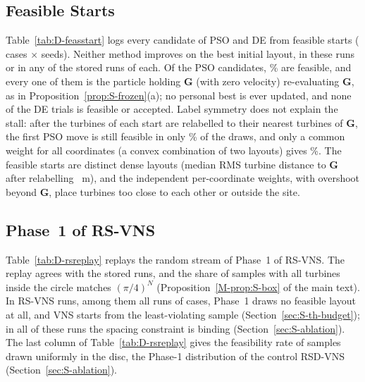 \documentclass[10pt]{article}
\begin{document}
\subsection{Feasible Starts}
\label{sec:S-diag-feas}
Table~\ref{tab:D-feasstart} logs every candidate of PSO and DE from feasible starts (\NDFsCases{} cases $\times$ \NDFsSeeds{} seeds). Neither method improves on the best initial layout, in these runs or in any of the \NDFsStoredRunsPSO{} stored runs of each. %
Of the \NDFsCandPSO{} PSO candidates, \NDFsFeasCandPSO\% are feasible, and every one of them is the particle holding $\mathbf G$ (with zero velocity) re-evaluating $\mathbf G$, as in Proposition~\ref{prop:S-frozen}(a); no personal best is ever updated, and none of the \NDFsCandDE{} DE trials is feasible or accepted. %
Label symmetry does not explain the stall: after the turbines of each start are relabelled to their nearest turbines of $\mathbf G$, the first PSO move is still feasible in only \NDFsMixMatched\% of the draws, and only a common weight for all coordinates (a convex combination of two layouts) gives \NDFsMixScalar\%. %
The feasible starts are distinct dense layouts (median RMS turbine distance to $\mathbf G$ after relabelling \NDFsInitRms~m), and the independent per-coordinate weights, with overshoot beyond $\mathbf G$, place turbines too close to each other or outside the site. %

\subsection{Phase~1 of RS-VNS}
\label{sec:S-diag-rs}
Table~\ref{tab:D-rsreplay} replays the random stream of Phase~1 of RS-VNS. The replay agrees with the stored runs, and the share of samples with all turbines inside the circle matches $(\pi/4)^N$ (Proposition~\ref{M-prop:S-box} of the main text). In \NDRsRunsNoFeasSample{} RS-VNS runs, among them all runs of \NDRsCasesNoFeasSample{} cases, Phase~1 draws no feasible layout at all, and VNS starts from the least-violating sample (Section~\ref{sec:S-th-budget}); in all of these runs the spacing constraint is binding (Section~\ref{sec:S-ablation}). The last column of Table~\ref{tab:D-rsreplay} gives the feasibility rate of samples drawn uniformly in the disc, the Phase-1 distribution of the control RSD-VNS (Section~\ref{sec:S-ablation}). %
\end{document}
